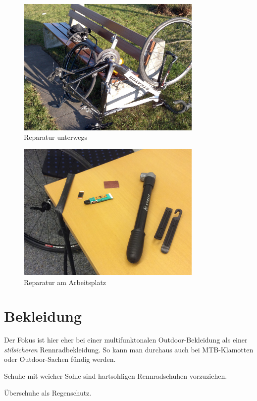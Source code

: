 \begin{figure}[htpb]
        \centering
        \includegraphics[width=0.8\textwidth]{figures/reparatur-unterwegs.jpg}
        \caption{Reparatur unterwegs}
        \label{fig:reparatur-unterwegs}
\end{figure}

\begin{figure}[htpb]
        \centering
        \includegraphics[width=0.8\textwidth]{figures/reparatur-arbeitsplatz.jpg}
        \caption{Reparatur am Arbeitsplatz}
        \label{fig:reparatur-arbeitsplatz}
\end{figure}

\section{Bekleidung}

Der Fokus ist hier eher bei einer multifunktonalen Outdoor-Bekleidung
als einer \emph{stilsicheren} Rennradbekleidung.
So kann man durchaus auch bei MTB-Klamotten oder Outdoor-Sachen fündig werden.

Schuhe mit weicher Sohle sind hartsohligen Rennradschuhen vorzuziehen.

Überschuhe als Regenschutz.
